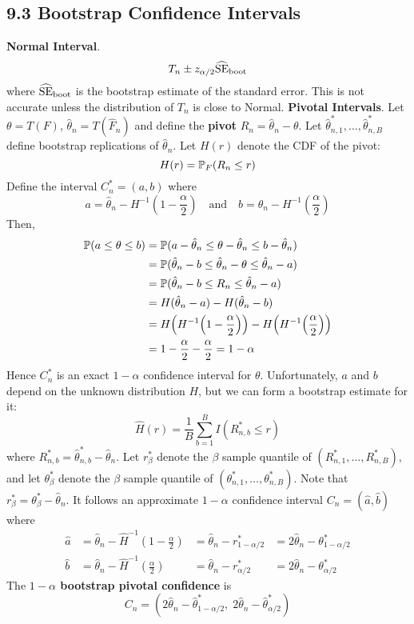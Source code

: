 \subsection*{9.3 Bootstrap Confidence
Intervals}\label{bootstrap-confidence-intervals}
\textbf{Normal Interval}.
\[
T_{n} \pm z_{\alpha/2} \widehat{\operatorname{\mathrm{SE}}}_\text{boot}
\]
where \(\widehat{\operatorname{\mathrm{SE}}}_\text{boot}\) is the bootstrap estimate of the
standard error. This is not accurate unless the distribution of \(T_{n}\)
is close to Normal.
\textbf{Pivotal Intervals}.
Let \(\theta = T(F)\), \(\hat{\theta}_{n} = T(\hat{F}_{n})\) and define the
\textbf{pivot} \(R_{n} = \hat{\theta}_{n}  - \theta\). Let
\(\hat{\theta}_{n, 1}^{*}, \dots, \hat{\theta}_{n, B}^{*}\) define bootstrap
replications of \(\hat{\theta}_{n}\). Let \(H(r)\) denote the CDF of the
pivot:
\[
H(r) = \operatorname{\mathbb{P}}_F(R_{n} \leq r)
\]
Define the interval \(C_{n}^{*} = (a, b)\) where
\[
a = \hat{\theta}_{n} - H^{-1}\left( 1 - \frac{\alpha}{2} \right) 
\quad\text{and}\quad
b = \hat{\theta}_{n} - H^{-1}\left( \frac{\alpha}{2} \right) 
\]
Then,
\begin{align*}
\PROB(a \leq \theta \leq b) &= \PROB(a - \hat{\theta}_{n} \leq \theta - \hat{\theta}_{n} \leq b - \hat{\theta}_{n}) \\
&= \PROB(\hat{\theta}_{n} - b \leq \hat{\theta}_{n} - \theta \leq \hat{\theta}_{n} - a) \\
&= \PROB(\hat{\theta}_{n} - b \leq R_{n} \leq \hat{\theta}_{n} - a) \\
&= H(\hat{\theta}_{n} - a) - H(\hat{\theta}_{n} - b) \\
&= H\left(H^{-1}\left( 1 - \frac{\alpha}{2} \right) \right) - H\left(H^{-1}\left( \frac{\alpha}{2} \right)\right) \\
&= 1 - \frac{\alpha}{2}  - \frac{\alpha}{2} = 1 - \alpha
\end{align*}
Hence \(C_{n}^{*}\) is an exact \(1 - \alpha\) confidence interval for
\(\theta\).
Unfortunately, \(a\) and \(b\) depend on the unknown distribution \(H\),
but we can form a bootstrap estimate for it:
\[
\hat{H}(r) = \frac{1}{B} \sum_{b=1}^B I(R_{n, b}^{*} \leq r)
\]
where \(R_{n, b}^{*} = \hat{\theta}_{n, b}^{*} - \hat{\theta}_{n}\).
Let \(r_\beta^{*}\) denote the \(\beta\) sample quantile of
\((R_{n, 1}^{*}, \dots, R_{n, B}^{*})\), and let \(\theta_\beta^{*}\) denote
the \(\beta\) sample quantile of
\((\theta_{n, 1}^{*}, \dots, \theta_{n, B}^{*})\). Note that
\(r_\beta^{*} = \theta_\beta^{*} - \hat{\theta}_{n}\). It follows an
approximate \(1 - \alpha\) confidence interval
\(C_{n} = (\hat{a}, \hat{b})\) where
\begin{align*}
\hat{a} 
&= \hat{\theta}_{n} - \hat{H}^{-1}\left(1 - \frac{\alpha}{2}\right) 
&= \hat{\theta}_{n} - r_{1 - \alpha/2}^{*} 
&= 2\hat{\theta}_{n} - \theta_{1 - \alpha/2}^{*} \\
\hat{b} 
&= \hat{\theta}_{n} - \hat{H}^{-1}\left(\frac{\alpha}{2}\right) 
&= \hat{\theta}_{n} - r_{\alpha/2}^{*} 
&= 2\hat{\theta}_{n} - \theta_{\alpha/2}^{*} 
\end{align*}
The \textbf{\(1 - \alpha\) bootstrap pivotal confidence} is
\[
C_{n} = \left(2 \hat{\theta}_{n} - \hat{\theta}_{1 - \alpha/2}^{*}, \; 2 \hat{\theta}_{n} - \hat{\theta}_{\alpha/2}^{*} \right)
\]

